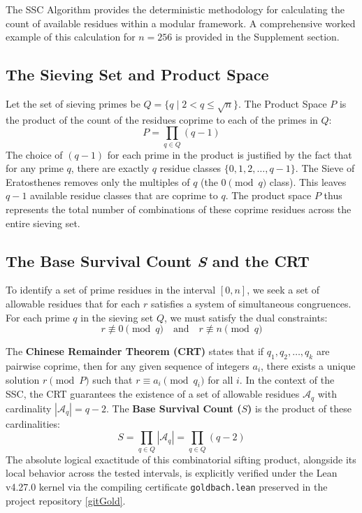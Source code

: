 \documentclass[twoside,9pt]{extarticle}
\begin{document}
The SSC Algorithm provides the deterministic methodology for calculating the count of available residues within a modular framework. A comprehensive worked example of this calculation for $n=256$ is provided in the Supplement section.

\subsection{The Sieving Set and Product Space}
\label{subsec:sieving_set}

Let the set of sieving primes be $Q = \{q \mid 2 < q \le \sqrt{n}\}$. The Product Space $P$ is the product of the count of the residues coprime to each of the primes in $Q$:
\begin{equation}
P = \prod_{q \in Q} (q - 1)
\end{equation}
The choice of $(q-1)$ for each prime in the product is justified by the fact that for any prime $q$, there are exactly $q$ residue classes $\{0, 1, 2, \dots, q-1\}$. The Sieve of Eratosthenes removes only the multiples of $q$ (the $0 \pmod{q}$ class). This leaves $q-1$ available residue classes that are coprime to $q$. The product space $P$ thus represents the total number of combinations of these coprime residues across the entire sieving set.

\subsection{The Base Survival Count \textit{S} and the CRT}
\label{subsec:base_survival}

To identify a set of prime residues in the interval $[0, n]$, we seek a set of allowable residues that for each $r$ satisfies a system of simultaneous congruences. For each prime $q$ in the sieving set $Q$, we must satisfy the dual constraints:
\begin{equation}
r \not\equiv 0 \pmod{q} \quad \text{and} \quad r \not\equiv n \pmod{q}
\end{equation}

The \textbf{Chinese Remainder Theorem (CRT)} states that if $q_1, q_2, \dots, q_k$ are pairwise coprime, then for any given sequence of integers $a_i$, there exists a unique solution $r \pmod{P}$ such that $r \equiv a_i \pmod{q_i}$ for all $i$. In the context of the SSC, the CRT guarantees the existence of a set of allowable residues $\mathcal{A}_q$ with cardinality $|\mathcal{A}_q| = q-2$. The \textbf{Base Survival Count ($S$)} is the product of these cardinalities:
\begin{equation}
S = \prod_{q \in Q} |\mathcal{A}_q| = \prod_{q \in Q} (q - 2)
\end{equation}
The absolute logical exactitude of this combinatorial sifting product, alongside its local behavior across the tested intervals, is explicitly verified under the Lean v4.27.0 kernel via the compiling certificate \texttt{goldbach.lean} preserved in the project repository \ref{gitGold}.
\end{document}

